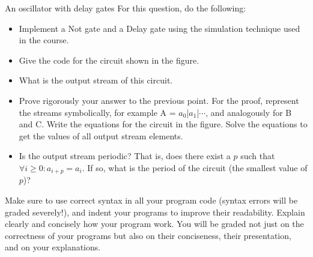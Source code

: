 
\def\date{Jun. 20, 2014}

\begin{Q1}{An oscillator with delay gates}
  For this question, do the following:
  \begin{itemize}
    \item Implement a Not gate and a Delay gate using the simulation technique used in the course.
    \item Give the code for the circuit shown in the figure.
    \item What is the output stream of this circuit.
    \item Prove rigorously your answer to the previous point.
      For the proof,
      represent the streams symbolically, for example
      A = $a_0$|$a_1$|$\cdots$,
      and analogously for B and C.
      Write the equations for the circuit in the figure.
      Solve the equations to get the values of all output stream
      elements.
    \item Is the output stream periodic?
      That is, does there exist a $p$ such that
      $\forall i \geq 0: a_{i+p}=a_i$.
      If so, what is the period of the circuit (the smallest value of $p$)?
  \end{itemize}
  Make sure to use correct syntax in all your program code (syntax errors will be graded severely!),
  and indent your programs to improve their readability.
  Explain clearly and concisely how your program work.
  You will be graded not just on the correctness of your programs
  but also on their conciseness, their presentation, and on your explanations.
\end{Q1}

